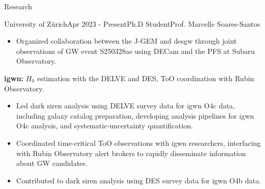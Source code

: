 \documentclass{resume} %
\begin{document}
\begin{rSection}{Research}
\begin{rSubsection}{University of Zürich}{Apr 2023 - Present}{Ph.D Student}{Prof. Marcelle Soares-Santos}
\begin{itemize}
         \item Organized collaboration between the \ac{J-GEM} and \ac{desgw} through joint observations of \ac{GW} event S250328ae using \ac{DECam} and the \ac{PFS} at Subaru Observatory.
     \end{itemize}  
     \item \textbf{\ac{igwn}:} $H_0$ estimation with the \ac{DELVE} and \ac{DES}, \ac{ToO} coordination with Rubin Observatory.
     \begin{itemize}
         \item Led dark siren analysis using \ac{DELVE} survey data for \ac{igwn} O4c data, including galaxy catalog preparation, developing analysis pipelines for \ac{igwn} O4c analysis, and systematic-uncertainty quantification.
         \item Coordinated time-critical \ac{ToO} observations with \ac{igwn} researchers, interfacing with Rubin Observatory alert brokers to rapidly disseminate information about \ac{GW} candidates.
         \item Contributed to dark siren analysis using \ac{DES} survey data for \ac{igwn} O4b data.
     \end{itemize}  


\end{rSubsection}
\end{rSection}
\end{document}
